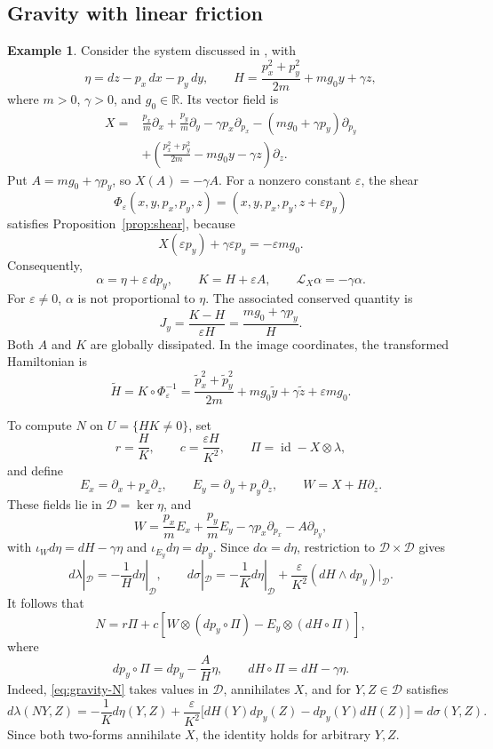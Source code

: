 \documentclass[11pt,a4paper]{article}
\numberwithin{equation}{section}
\theoremstyle{definition}
\newtheorem{example}{Example}
\theoremstyle{remark}
\newcommand{\id}{\operatorname{id}}
\begin{document}
\subsection{Gravity with linear friction}

\begin{example}
Consider the system discussed in
\cite[Section~5.2]{GGMRR2020}, with
\[
\eta=dz-p_x\,dx-p_y\,dy,\qquad
H=\frac{p_x^2+p_y^2}{2m}+mg_0y+\gamma z,
\]
where $m>0$, $\gamma>0$, and $g_0\in\mathbb R$.
Its vector field is
\begin{align*}
X={}&\frac{p_x}{m}\partial_x+\frac{p_y}{m}\partial_y
-\gamma p_x\partial_{p_x}
-(mg_0+\gamma p_y)\partial_{p_y}\\
&+\left(\frac{p_x^2+p_y^2}{2m}-mg_0y-\gamma z\right)
\partial_z.
\end{align*}
Put $A=mg_0+\gamma p_y$, so $X(A)=-\gamma A$.
For a nonzero constant $\varepsilon$, the shear
\[
\Phi_\varepsilon(x,y,p_x,p_y,z)
=(x,y,p_x,p_y,z+\varepsilon p_y)
\]
satisfies Proposition~\ref{prop:shear}, because
\[
X(\varepsilon p_y)+\gamma\varepsilon p_y
=-\varepsilon mg_0.
\]
Consequently,
\[
\alpha=\eta+\varepsilon\,dp_y,\qquad
K=H+\varepsilon A,\qquad
\mathcal L_X\alpha=-\gamma\alpha.
\]
For $\varepsilon\neq0$, $\alpha$ is not proportional
to $\eta$. The associated conserved quantity is
\begin{equation}
J_y=\frac{K-H}{\varepsilon H}
=\frac{mg_0+\gamma p_y}{H}.
\label{eq:gravity-Jy}
\end{equation}
Both $A$ and $K$ are globally dissipated.
In the image coordinates, the transformed Hamiltonian is
\[
\widetilde H=K\circ\Phi_\varepsilon^{-1}
=\frac{\widetilde p_x^2+\widetilde p_y^2}{2m}
+mg_0\widetilde y+\gamma\widetilde z+\varepsilon mg_0.
\]

To compute $N$ on $U=\{HK\neq0\}$, set
\[
r=\frac HK,\qquad c=\frac{\varepsilon H}{K^2},
\qquad \Pi=\id-X\otimes\lambda,
\]
and define
\[
E_x=\partial_x+p_x\partial_z,\qquad
E_y=\partial_y+p_y\partial_z,\qquad
W=X+H\partial_z.
\]
These fields lie in $\mathcal D=\ker\eta$, and
\[
W=\frac{p_x}{m}E_x+\frac{p_y}{m}E_y
-\gamma p_x\partial_{p_x}-A\partial_{p_y},
\]
with
$\iota_Wd\eta=dH-\gamma\eta$ and
$\iota_{E_y}d\eta=dp_y$.
Since $d\alpha=d\eta$, restriction to
$\mathcal D\times\mathcal D$ gives
\[
d\lambda|_{\mathcal D}=-\frac1H d\eta|_{\mathcal D},
\qquad
d\sigma|_{\mathcal D}
=-\frac1K d\eta|_{\mathcal D}
+\frac{\varepsilon}{K^2}(dH\wedge dp_y)|_{\mathcal D}.
\]
It follows that
\begin{equation}
N=r\Pi+c\left[
W\otimes(dp_y\circ \Pi)-E_y\otimes(dH\circ \Pi)
\right],
\label{eq:gravity-N}
\end{equation}
where
\[
dp_y\circ \Pi=dp_y-\frac AH\eta,\qquad
dH\circ \Pi=dH-\gamma\eta.
\]
Indeed, \eqref{eq:gravity-N} takes values in
$\mathcal D$, annihilates $X$, and for
$Y,Z\in\mathcal D$ satisfies
\[
d\lambda(NY,Z)
=-\frac1K d\eta(Y,Z)
+\frac{\varepsilon}{K^2}
\bigl[dH(Y)dp_y(Z)-dp_y(Y)dH(Z)\bigr]
=d\sigma(Y,Z).
\]
Since both two-forms annihilate $X$, the identity
holds for arbitrary $Y,Z$.


\end{example}
\end{document}
